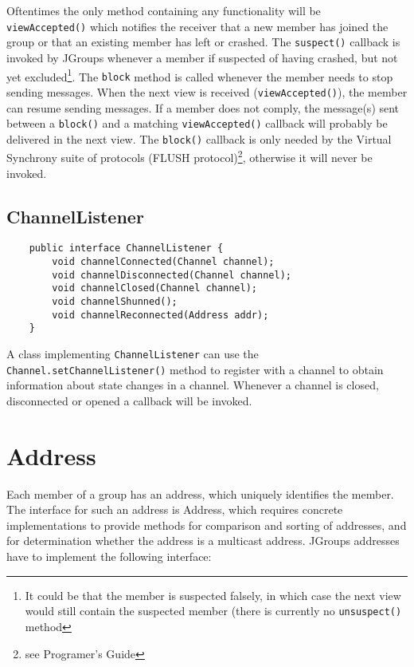    Oftentimes the only method containing any functionality will be {\tt
    viewAccepted()} which notifies the receiver that a new member has joined the
    group or that an existing member has left or crashed. The {\tt suspect()}
    callback is invoked by JGroups whenever a member if suspected of having
    crashed, but not yet excluded\footnote{It could be that the member is suspected
    falsely, in which case the next view would still contain the suspected member
    (there is currently no {\tt unsuspect()} method}. The {\tt block} method is
    called whenever the member needs to stop sending messages. When the next view is
    received ({\tt viewAccepted()}), the member can resume sending messages. If a
    member does not comply, the message(s) sent between a {\tt block()} and a
    matching {\tt viewAccepted()} callback will probably be delivered in the next
    view. The {\tt block()} callback is only needed by the Virtual Synchrony suite of
    protocols (FLUSH protocol)\footnote{see Programer's Guide}, otherwise it will
    never be invoked.


    \subsection{ChannelListener}

    \begin{small}
    \begin{verbatim}
    public interface ChannelListener {
        void channelConnected(Channel channel);
        void channelDisconnected(Channel channel);
        void channelClosed(Channel channel);
        void channelShunned();
        void channelReconnected(Address addr);
    }
    \end{verbatim}
    \end{small}

    A class implementing {\tt ChannelListener} can use the {\tt
    Channel.setChannelListener()} method to register with a channel to obtain
    information about state changes in a channel. Whenever a channel is closed,
    disconnected or opened a callback will be invoked.




  \section{Address}

  Each member of a group has an address, which uniquely identifies the member. The
  interface for such an address is Address, which requires concrete implementations
  to provide methods for comparison and sorting of addresses, and for determination
  whether the address is a multicast address. JGroups addresses have to implement
  the following interface:

